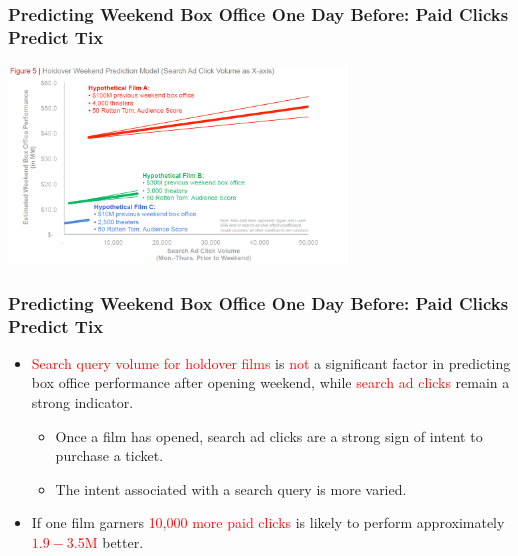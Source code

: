 \documentclass[slidestop,compress,red,mathserif]{beamer}
\begin{document}
\begin{frame}
\frametitle{Predicting Weekend Box Office One Day Before: Paid Clicks Predict Tix}
\begin{center}
\includegraphics[width=9cm]{fig5.png}
\end{center}
\end{frame}
\begin{frame}
\frametitle{Predicting Weekend Box Office One Day Before: Paid Clicks Predict Tix}
\begin{itemize}
	\pause \item \textcolor{red}{Search query volume for holdover films} is \textcolor{red}{not} a significant factor in predicting box office performance after opening weekend, while \textcolor{red}{search ad clicks} remain a strong indicator.
	\begin{itemize}
		\pause \item Once a film has opened, search ad clicks are a strong sign of intent to purchase a ticket.
		\pause \item The intent associated with a search query is more varied.
	\end{itemize}
	\pause \item If one film garners \textcolor{red}{10,000 more paid clicks}  is likely to perform approximately \textcolor{red}{$1.9-$3.5M} better.
\end{itemize}
\end{frame}
\end{document}
